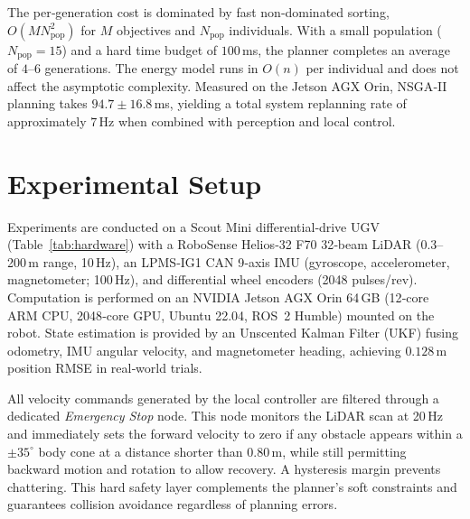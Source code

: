 \documentclass[lettersize,journal]{IEEEtran}
\begin{document}
The per‑generation cost is dominated by fast non‑dominated sorting,
$O(M N_{\mathrm{pop}}^2)$ for $M$ objectives and $N_{\mathrm{pop}}$
individuals. With a small population ($N_{\mathrm{pop}}=15$) and a hard time
budget of $100$\,ms, the planner completes an average of $4$–$6$ generations.
The energy model runs in $O(n)$ per individual and does not affect the
asymptotic complexity. Measured on the Jetson AGX Orin, NSGA‑II planning takes
$94.7 \pm 16.8$\,ms, yielding a total system replanning rate of approximately
$7$\,Hz when combined with perception and local control.

\section{Experimental Setup}
\label{sec:setup}

Experiments are conducted on a Scout Mini differential‑drive UGV
(Table~\ref{tab:hardware}) with a RoboSense Helios‑32 F70 32‑beam LiDAR
(0.3--200\,m range, 10\,Hz), an LPMS‑IG1 CAN 9‑axis IMU (gyroscope,
accelerometer, magnetometer; 100\,Hz), and differential wheel encoders
(2048 pulses/rev). Computation is performed on an NVIDIA Jetson AGX Orin
64\,GB (12‑core ARM CPU, 2048‑core GPU, Ubuntu 22.04, ROS~2 Humble) mounted
on the robot. State estimation is provided by an Unscented Kalman Filter (UKF)
fusing odometry, IMU angular velocity, and magnetometer heading,
achieving $0.128$\,m position RMSE in real‑world trials.

All velocity commands generated by the local controller are filtered through a
dedicated \emph{Emergency Stop} node. This node monitors the LiDAR scan at
20\,Hz and immediately sets the forward velocity to zero if any obstacle
appears within a $\pm 35^\circ$ body cone at a distance shorter than
$0.80$\,m, while still permitting backward motion and rotation to allow
recovery. A hysteresis margin prevents chattering. This hard safety layer
complements the planner’s soft constraints and guarantees collision avoidance
regardless of planning errors.
\end{document}
